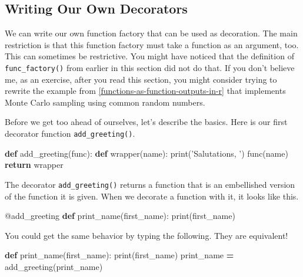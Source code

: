 \documentclass[12pt,krantz2]{krantz}
\makeatletter
\newenvironment{Shaded}{\begin{snugshade}}{\end{snugshade}}
\newcommand{\AttributeTok}[1]{\textcolor[rgb]{0.61,0.61,0.61}{#1}}
\newcommand{\BuiltInTok}[1]{#1}
\newcommand{\ControlFlowTok}[1]{\textcolor[rgb]{0.27,0.27,0.27}{\textbf{#1}}}
\newcommand{\KeywordTok}[1]{\textcolor[rgb]{0.27,0.27,0.27}{\textbf{#1}}}
\newcommand{\NormalTok}[1]{#1}
\newcommand{\OperatorTok}[1]{\textcolor[rgb]{0.43,0.43,0.43}{\textbf{#1}}}
\newcommand{\StringTok}[1]{\textcolor[rgb]{0.5,0.5,0.5}{#1}}
\newenvironment{kframe}{%
\medskip{}
\setlength{\fboxsep}{.8em}
 \def\at@end@of@kframe{}%
 \ifinner\ifhmode%
  \def\at@end@of@kframe{\end{minipage}}%
  \begin{minipage}{\columnwidth}%
 \fi\fi%
 \def\FrameCommand##1{\hskip\@totalleftmargin \hskip-\fboxsep
 \colorbox{shadecolor}{##1}\hskip-\fboxsep
     \hskip-\linewidth \hskip-\@totalleftmargin \hskip\columnwidth}%
 \MakeFramed {\advance\hsize-\width
   \@totalleftmargin\z@ \linewidth\hsize
   \@setminipage}}%
 {\par\unskip\endMakeFramed%
 \at@end@of@kframe}
\renewenvironment{Shaded}{\begin{kframe}}{\end{kframe}}
\makeatother
\begin{document}
\hypertarget{writing-our-own-decorators}{%
\subsection{Writing Our Own Decorators}\label{writing-our-own-decorators}}

We can write our own function factory that can be used as decoration. The main restriction is that this function factory must take a function as an argument, too. This can sometimes be restrictive. You might have noticed that the definition of \texttt{func\_factory()} from earlier in this section did not do that. If you don't believe me, as an exercise, after you read this section, you might consider trying to rewrite the example from \ref{functions-as-function-outputs-in-r} that implements Monte Carlo sampling using common random numbers.

Before we get too ahead of ourselves, let's describe the basics. Here is our first decorator function \texttt{add\_greeting()}.

\begin{Shaded}
\begin{Highlighting}[]
\KeywordTok{def}\NormalTok{ add_greeting(func):}
    \KeywordTok{def}\NormalTok{ wrapper(name):}
        \BuiltInTok{print}\NormalTok{(}\StringTok{'Salutations, '}\NormalTok{)}
\NormalTok{        func(name)}
    \ControlFlowTok{return}\NormalTok{ wrapper}
\end{Highlighting}
\end{Shaded}

The decorator \texttt{add\_greeting()} returns a function that is an embellished version of the function it is given. When we decorate a function with it, it looks like this.

\begin{Shaded}
\begin{Highlighting}[]
\AttributeTok{@add_greeting}
\KeywordTok{def}\NormalTok{ print_name(first_name):}
    \BuiltInTok{print}\NormalTok{(first_name)}
\end{Highlighting}
\end{Shaded}

You could get the same behavior by typing the following. They are equivalent!

\begin{Shaded}
\begin{Highlighting}[]
\KeywordTok{def}\NormalTok{ print_name(first_name):}
    \BuiltInTok{print}\NormalTok{(first_name)}
\NormalTok{print_name }\OperatorTok{=}\NormalTok{ add_greeting(print_name)}
\end{Highlighting}
\end{Shaded}
\end{document}
